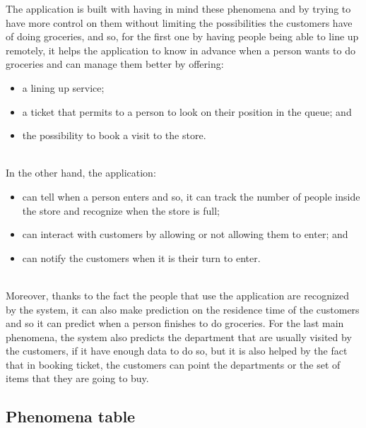 The application is built with having in mind these phenomena and by trying to have more control on them without limiting the possibilities the customers have of doing groceries, and so, for the first one by having people being able to line up remotely, it helps the application to know in advance when a person wants to do groceries and can manage them better by offering:
\begin{itemize}
	\item a lining up service;
	\item a ticket that permits to a person to look on their position in the queue; and
	\item the possibility to book a visit to the store.
\end{itemize}
\ \\
In the other hand, the application:
\begin{itemize}
	\item can tell when a person enters and so, it can track the number of people inside the store and recognize when the store is full;
	\item can interact with customers by allowing or not allowing them to enter; and
	\item can notify the customers when it is their turn to enter.
\end{itemize}
\ \\
Moreover, thanks to the fact the people that use the application are recognized by the system, it can also make prediction on the residence time of the customers and so it can predict when a person finishes to do groceries.
For the last main phenomena, the system also predicts the department that are usually visited by the customers, if it have enough data to do so, but it is also helped by the fact that in booking ticket, the customers can point the departments or the set of items that they are going to buy. 

\subsection{Phenomena table}

